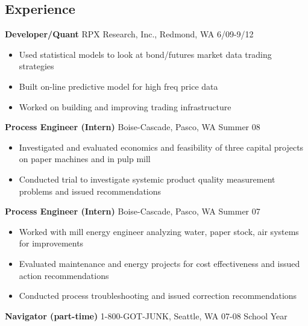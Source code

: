 \documentclass[margin]{res}
\begin{document}
 
 
\begin{resume} 
 

\section{Experience}
  {\bf Developer/Quant} RPX Research, Inc., Redmond, WA \hfill 6/09-9/12 
    \vspace{6pt}
   \begin{itemize} \itemsep -2pt  %
     \item Used statistical models to look at bond/futures market data  trading strategies 
     \item Built on-line predictive model for high freq price data 
     \item Worked on building and improving trading infrastructure
   \end{itemize}



  {\bf Process Engineer (Intern)} Boise-Cascade, Pasco, WA \hfill  Summer 08
    \vspace{6pt}
  \begin{itemize} \itemsep -2pt %
    \item Investigated and evaluated economics and feasibility of three capital projects on paper machines and in pulp mill 
    \item Conducted trial to investigate systemic product quality measurement problems and issued recommendations 
  \end{itemize}

  {\bf Process Engineer (Intern)} Boise-Cascade, Pasco, WA \hfill  Summer 07
    \vspace{6pt}
  \begin{itemize} \itemsep -2pt
    \item Worked with mill energy engineer analyzing water, paper stock, air systems for improvements 
    \item Evaluated maintenance and energy projects for cost effectiveness and issued action recommendations 
    \item Conducted process troubleshooting and issued correction recommendations
   \end{itemize}

  {\bf Navigator (part-time)} 1-800-GOT-JUNK, Seattle, WA \hfill  07-08 School Year


\end{resume}
\end{document}
